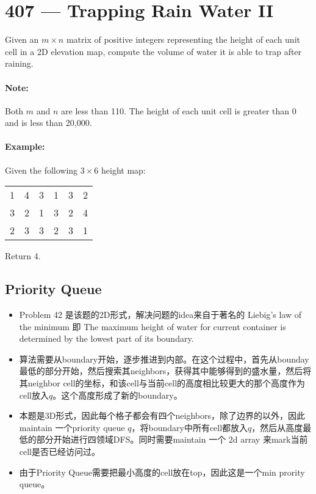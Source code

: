 \section{407 --- Trapping Rain Water II}
Given an $m \times n$ matrix of positive integers representing the height of each unit cell in a 2D elevation map, compute the volume of water it is able to trap after raining.

\paragraph{Note:}

\begin{flushleft}
Both $ m $ and $ n $ are less than 110. The height of each unit cell is greater than 0 and is less than 20,000.

\end{flushleft}
 

\paragraph{Example:}

\begin{flushleft}
Given the following $3\times 6$ height map:
\begin{table}[H]
\begin{tabular}{*{6}{c}}
1 & 4 & 3 & 1 & 3 & 2 \\ 
3 & 2 & 1 & 3 & 2 & 4 \\
2 & 3 & 3 & 2 & 3 & 1
\end{tabular}
\end{table}
Return 4.
\end{flushleft}

\subsection{Priority Queue}
\begin{itemize}
\item Problem 42 是该题的2D形式，解决问题的idea来自于著名的 Liebig's law of the minimum 即 The maximum height of water for current container is determined by the lowest part of its boundary.
\item 算法需要从boundary开始，逐步推进到内部。在这个过程中，首先从bounday最低的部分开始，然后搜索其neighbors，获得其中能够得到的盛水量，然后将其neighbor cell的坐标，和该cell与当前cell的高度相比较更大的那个高度作为cell放入$q$。这个高度形成了新的boundary。
\item 本题是3D形式，因此每个格子都会有四个neighbors，除了边界的以外，因此maintain 一个priority queue $q$，将boundary中所有cell都放入$q$，然后从高度最低的部分开始进行四领域DFS。同时需要maintain 一个 2d array 来mark当前cell是否已经访问过。
\item 由于Priority Queue需要把最小高度的cell放在top，因此这是一个min prority queue。
\end{itemize}

